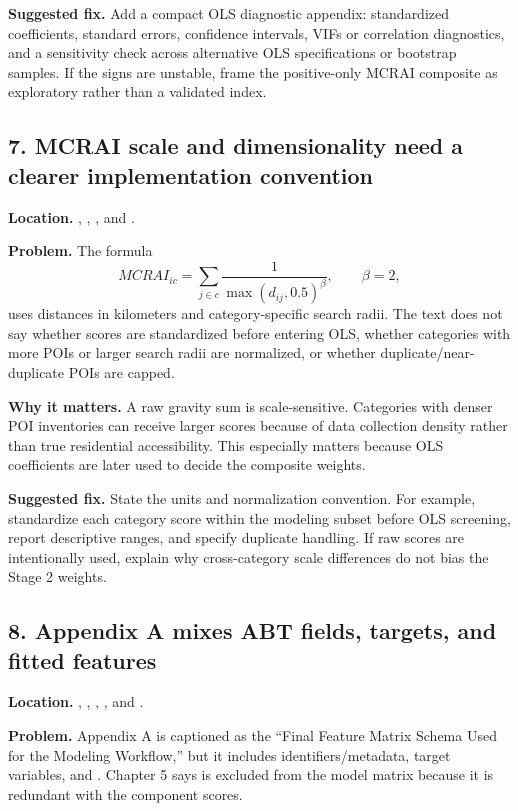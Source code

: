 \documentclass[11pt]{article}
\begin{document}
\textbf{Suggested fix.} Add a compact OLS diagnostic appendix: standardized coefficients, standard errors, confidence intervals, VIFs or correlation diagnostics, and a sensitivity check across alternative OLS specifications or bootstrap samples. If the signs are unstable, frame the positive-only MCRAI composite as exploratory rather than a validated index.

\subsection*{7. MCRAI scale and dimensionality need a clearer implementation convention}

\textbf{Location.} , , , and .

\textbf{Problem.} The formula
\[
MCRAI_{ic}=\sum_{j\in c}\frac{1}{\max(d_{ij},0.5)^\beta}, \qquad \beta=2,
\]
uses distances in kilometers and category-specific search radii. The text does not say whether scores are standardized before entering OLS, whether categories with more POIs or larger search radii are normalized, or whether duplicate/near-duplicate POIs are capped.

\textbf{Why it matters.} A raw gravity sum is scale-sensitive. Categories with denser POI inventories can receive larger scores because of data collection density rather than true residential accessibility. This especially matters because OLS coefficients are later used to decide the composite weights.

\textbf{Suggested fix.} State the units and normalization convention. For example, standardize each category score within the modeling subset before OLS screening, report descriptive ranges, and specify duplicate handling. If raw scores are intentionally used, explain why cross-category scale differences do not bias the Stage 2 weights.

\subsection*{8. Appendix A mixes ABT fields, targets, and fitted features}

\textbf{Location.} , , , , and .

\textbf{Problem.} Appendix A is captioned as the ``Final Feature Matrix Schema Used for the Modeling Workflow,'' but it includes identifiers/metadata, target variables, and . Chapter 5 says  is excluded from the model matrix because it is redundant with the component scores.
\end{document}
